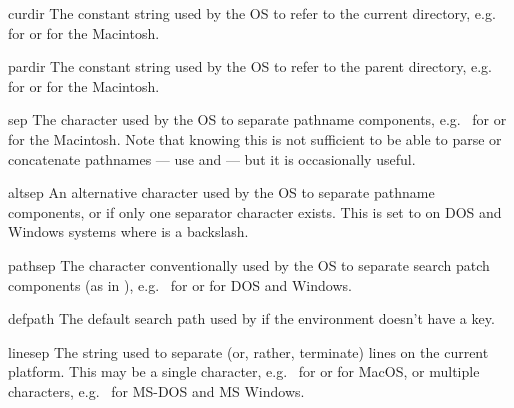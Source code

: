 \begin{datadesc}{curdir}
The constant string used by the OS to refer to the current directory,
e.g.\  for \POSIX{} or  for the Macintosh.
\end{datadesc}

\begin{datadesc}{pardir}
The constant string used by the OS to refer to the parent directory,
e.g.\  for \POSIX{} or  for the Macintosh.
\end{datadesc}

\begin{datadesc}{sep}
The character used by the OS to separate pathname components,
e.g.\ \character{/} for \POSIX{} or \character{:} for the Macintosh.
Note that knowing this is not sufficient to be able to parse or
concatenate pathnames --- use  and
 --- but it is occasionally useful.
\end{datadesc}

\begin{datadesc}{altsep}
An alternative character used by the OS to separate pathname components,
or  if only one separator character exists.  This is set to
\character{/} on DOS and Windows systems where  is a backslash.
\end{datadesc}

\begin{datadesc}{pathsep}
The character conventionally used by the OS to separate search patch
components (as in ), e.g.\ \character{:} for \POSIX{} or
\character{;} for DOS and Windows.
\end{datadesc}

\begin{datadesc}{defpath}
The default search path used by  if the environment
doesn't have a  key.
\end{datadesc}

\begin{datadesc}{linesep}
The string used to separate (or, rather, terminate) lines on the
current platform.  This may be a single character,
e.g.\  for \POSIX{} or  for MacOS, or multiple
characters, e.g.\  for MS-DOS and MS Windows.
\end{datadesc}
